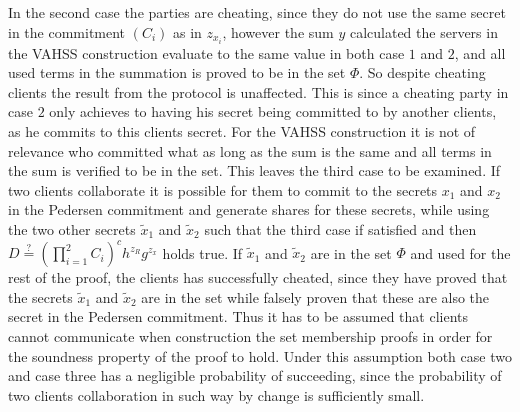 In the second case the parties are cheating, since they do not use the same secret in the commitment $(C_i)$ as in $z_{x_i}$, however the sum $y$ calculated the servers in the VAHSS construction evaluate to the same value in both case $1$ and $2$, and all used terms in the summation is proved to be in the set $\Phi$. So despite cheating clients the result from the protocol is unaffected. This is since a cheating party in case $2$ only achieves to having his secret being committed to by another clients, as he commits to this clients secret. For the VAHSS construction it is not of relevance who committed what as long as the sum is the same and all terms in the sum is verified to be in the set. This leaves the third case to be examined. If two clients collaborate it is possible for them to commit to the secrets $x_1$ and $x_2$ in the Pedersen commitment and generate shares for these secrets, while using the two other secrets $\tilde{x}_1$ and $\tilde{x}_2$ such that the third case if satisfied and then $D\overset{?}{=} ( \prod_{i=1}^2 C_i)^ch^{z_R}g^{z_x}$ holds true. If $\tilde{x}_1$ and $\tilde{x}_2$ are in the set $\Phi$ and used for the rest of the proof, the clients has successfully cheated, since they have proved that the secrets $\tilde{x}_1$ and $\tilde{x}_2$ are in the set while falsely proven that these are also the secret in the Pedersen commitment.  Thus it has to be assumed that clients cannot communicate when construction the set membership proofs in order for the soundness property of the proof to hold. Under this assumption both case two and case three has a negligible probability of succeeding, since the probability of two clients collaboration in such way by change is sufficiently small. %






